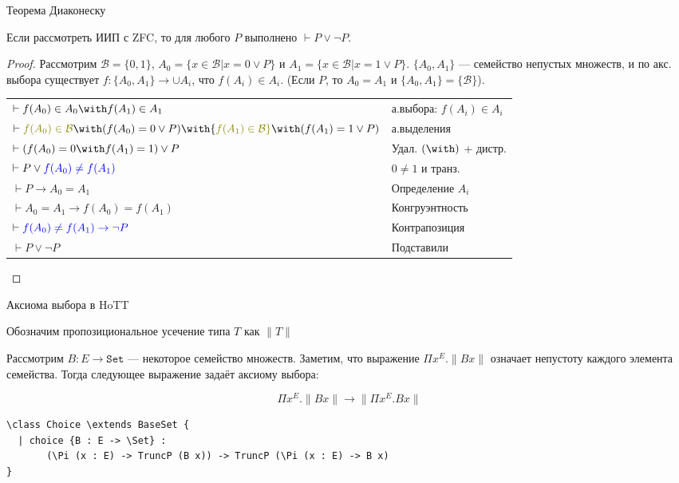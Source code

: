 \documentclass[aspectratio=169,dvipsnames,usenames]{beamer}
\begin{document}
\begin{frame}{Теорема Диаконеску}
\begin{thm}Если рассмотреть ИИП с ZFC, то для любого $P$ выполнено $\vdash P \vee \neg P$.\end{thm}
\begin{proof}Рассмотрим $\mathcal{B} = \{0,1\}$, $A_0 = \{ x \in \mathcal{B} | x = 0 \vee P \}$ и 
$A_1 = \{ x \in \mathcal{B} | x = 1 \vee P\}$.
$\{A_0,A_1\}$ --- семейство непустых множеств, и по акс. выбора существует
$f: \{A_0,A_1\} \rightarrow \cup A_i$, что $f(A_i) \in A_i$. (Если $P$, то $A_0 = A_1$ и $\{A_0,A_1\} = \{\mathcal{B}\}$).

\vspace{0.3cm}
\begin{tabular}{ll}
$\vdash f(A_0) \in A_0 \with f(A_1) \in A_1$ & а.выбора: $f(A_i) \in A_i$\\
$\vdash {\color{olive}f(A_0) \in \mathcal{B}} \with (f(A_0) = 0 \vee P) \with {\color{olive}f(A_1) \in \mathcal{B}} \with (f(A_1) = 1 \vee P)$ & а.выделения\\
$\vdash (f(A_0) = 0 \with f(A_1) = 1) \vee P$ & Удал. $(\with)$ + дистр.\\
$\vdash P\vee{\color{blue}f(A_0) \ne f(A_1)}$ & $0 \ne 1$ и транз.\\\pause
$\vdash P \rightarrow A_0 = A_1$ & Определение $A_i$\\
$\vdash A_0 = A_1 \rightarrow f(A_0) = f(A_1)$ & Конгруэнтность\\
$\vdash \color{blue} f(A_0) \ne f(A_1) \rightarrow \neg P$ & Контрапозиция\\
$\vdash P \vee \neg P$ & Подставили
\end{tabular}
\end{proof}
\end{frame}

\begin{frame}[fragile]{Аксиома выбора в HoTT}
\begin{dfn}Обозначим пропозициональное усечение типа $T$ как $\| T\|$\end{dfn}
Рассмотрим $B: E \rightarrow \texttt{Set}$ --- некоторое семейство множеств.
Заметим, что выражение $\Pi x^E.\| B x \|$ означает непустоту каждого элемента семейства.
Тогда следующее выражение задаёт аксиому выбора:

$$\Pi x^E.\| B x \| \rightarrow \| \Pi x^E.B x \|$$

\begin{verbatim}
\class Choice \extends BaseSet {
  | choice {B : E -> \Set} : 
       (\Pi (x : E) -> TruncP (B x)) -> TruncP (\Pi (x : E) -> B x)
}
\end{verbatim}
\end{frame}
\end{document}
